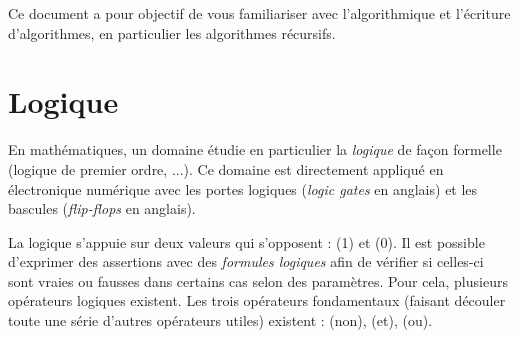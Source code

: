 \documentclass[11pt,a4paper]{article}
\begin{document}
\EncadreTitre

\bigskip


%
%

\bigskip


Ce document a pour objectif de vous familiariser avec l'algorithmique et l'écriture d'algorithmes, en particulier les algorithmes récursifs.

\bigskip


\section{Logique}

\bigskip

En mathématiques, un domaine étudie en particulier la \textit{logique} de façon formelle (logique de premier ordre, ...).
Ce domaine est directement appliqué en électronique numérique avec les portes logiques (\textit{logic gates} en anglais) et les bascules (\textit{flip-flops} en anglais).

\medskip

La logique s'appuie sur deux valeurs qui s'opposent :  (1) et  (0).
Il est possible d'exprimer des assertions avec des \textit{formules logiques} afin de vérifier si celles-ci sont vraies ou fausses dans certains cas selon des paramètres.
Pour cela, plusieurs opérateurs logiques existent.
Les trois opérateurs fondamentaux (faisant découler toute une série d'autres opérateurs utiles) existent :  (non),  (et),  (ou).

\medskip
\end{document}
